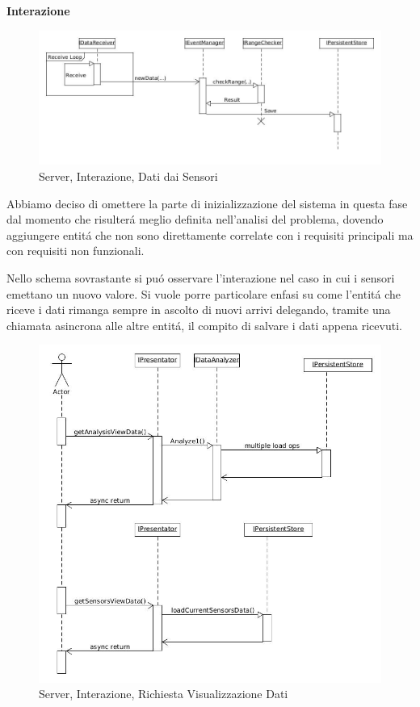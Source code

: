 \afterpage{\clearpage}

\newpage

\begin{center}
\textbf{Interazione}
\end{center}

\begin{figure}[h]
\centering
\includegraphics[width=\textwidth]{Figures/DomainModel/Server/NewDataInteraction}
\caption{Server, Interazione, Dati dai Sensori}
\end{figure}

Abbiamo deciso di omettere la parte di inizializzazione del sistema in questa fase dal momento che risulter\'a meglio definita nell'analisi del problema, dovendo aggiungere entit\'a che non sono direttamente correlate con i requisiti principali ma con requisiti non funzionali.

Nello schema sovrastante si pu\'o osservare l'interazione nel caso in cui i sensori emettano un nuovo valore. Si vuole porre particolare enfasi su come l'entit\'a che riceve i dati rimanga sempre in ascolto di nuovi arrivi delegando, tramite una chiamata asincrona alle altre entit\'a, il compito di salvare i dati appena ricevuti.

\newpage

\begin{figure}[h]
\centering
\includegraphics[scale=0.4]{Figures/DomainModel/Server/GetOperationInteraction}
\caption{Server, Interazione, Richiesta Visualizzazione Dati}
\end{figure}

